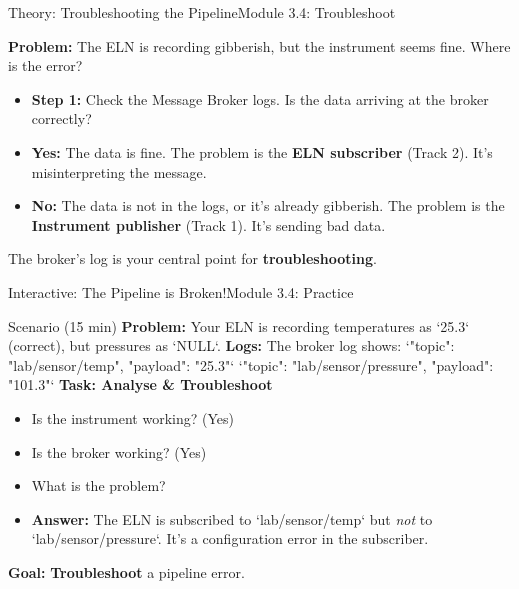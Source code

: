 \begin{frame}{Theory: Troubleshooting the Pipeline}{Module 3.4: Troubleshoot}
    
    \textbf{Problem:} The ELN is recording gibberish, but the instrument seems fine. Where is the error?
    \pause
    \begin{itemize}
        \item \textbf{Step 1:} Check the Message Broker logs. Is the data arriving at the broker correctly?
        \pause
        \item \textbf{Yes:} The data is fine. The problem is the \textbf{ELN subscriber} (Track 2). It's misinterpreting the message.
        \pause
        \item \textbf{No:} The data is not in the logs, or it's already gibberish. The problem is the \textbf{Instrument publisher} (Track 1). It's sending bad data.
    \end{itemize}
    \pause
    The broker's log is your central point for \textbf{troubleshooting}.
\end{frame}

\begin{frame}{Interactive: The Pipeline is Broken!}{Module 3.4: Practice}
    \begin{block}{Scenario (15 min)}
        \textbf{Problem:} Your ELN is recording temperatures as `25.3` (correct), but pressures as `NULL`.
        \pause
        \textbf{Logs:} The broker log shows:
        `{"topic": "lab/sensor/temp", "payload": "25.3"}`
        `{"topic": "lab/sensor/pressure", "payload": "101.3"}`
        \pause
        \textbf{Task: Analyse \& Troubleshoot}
        \begin{itemize}
            \item Is the instrument working? (Yes)
            \item Is the broker working? (Yes)
            \item What is the problem?
            \pause
            \item \textbf{Answer:} The ELN is subscribed to `lab/sensor/temp` but \emph{not} to `lab/sensor/pressure`. It's a configuration error in the subscriber.
        \end{itemize}
        \textbf{Goal:} \textbf{Troubleshoot} a pipeline error.
    \end{block}
\end{frame}

